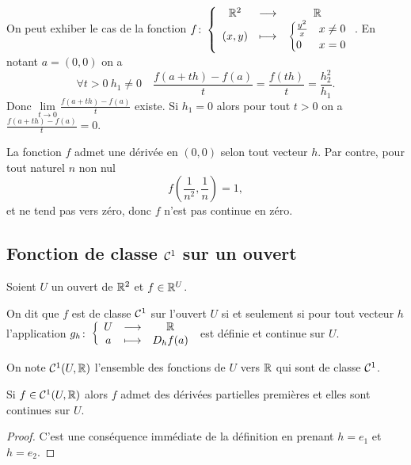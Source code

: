 On peut exhiber le cas de la fonction \(f\colon \left\{\begin{array}{ccc} \mathbb{R}^2 & \longrightarrow &\mathbb{R}\\ (x, 
y) & \longmapsto & 
  \begin{cases}
  \frac{y^2}{x} & x\neq 0 \\ 
  0 & x=0
  \end{cases}
 \end{array} \right.\).
En notant \(a=(0, 0)\) on a
\begin{equation}
  \forall t>0 \ h_1\neq 0 \quad \frac{f(a+th)-f(a)}{t} = \frac{f(th)}{t} = 
  \frac{h_2^2}{h_1}.
\end{equation}
Donc \(\lim\limits_{t\to 0} \frac{f(a+th)-f(a)}{t}\) existe. Si \(h_1=0\) 
alors pour tout \(t>0\) on a \(\frac{f(a+th)-f(a)}{t}=0\).

La fonction \(f\) admet une dérivée en \((0, 0)\) selon tout vecteur 
\(h\). Par contre, pour tout naturel \(n\) non nul
\begin{equation}
  f\left(\frac{1}{n^2}, \frac{1}{n}\right)=1,
\end{equation}
et ne tend pas vers zéro, donc \(f\) n'est pas continue en zéro.

\subsection{Fonction de classe \(\mathcal{C}^{1}\) sur un ouvert}

Soient \(U\) un ouvert de \(\mathbb{R}^2\) et \(f \in \mathbb{R}^U\).

\begin{defdef}
  On dit que \(f\) est de classe \(\mathcal{C}^{1}\) sur l'ouvert \(U\) si et 
  seulement si pour tout vecteur \(h\) l'application 
  \(g_h\colon \left\{\begin{array}{ccc} U & \longrightarrow &\mathbb{R}\\ a & \longmapsto & D_h f(a) \end{array} \right.\) est définie et continue sur 
  \(U\).

  On note \(\mathcal{C}^{1}(U, \mathbb{R})\) l'ensemble des fonctions de \(U\) vers 
  \(\mathbb{R}\) qui sont de classe \(\mathcal{C}^{1}\).
\end{defdef}

\begin{prop}
  Si \(f \in \mathcal{C}^{1}(U, \mathbb{R})\) alors \(f\) admet des dérivées partielles 
  premières et elles sont continues sur \(U\).
\end{prop}
\begin{proof}
  C'est une conséquence immédiate de la définition en prenant \(h=e_1\) et 
  \(h=e_2\).
\end{proof}

